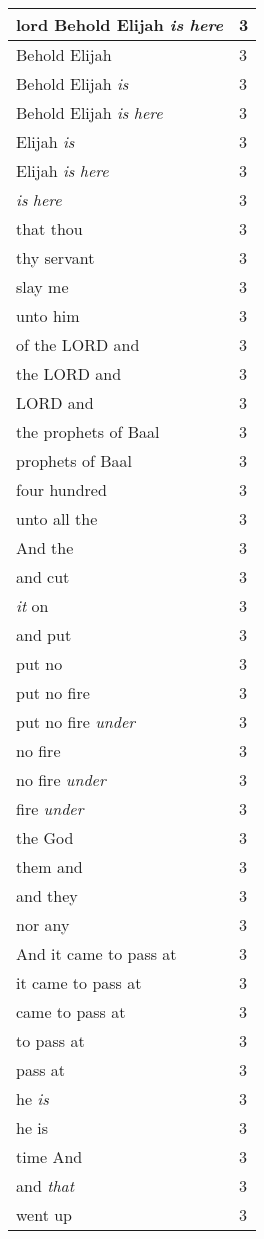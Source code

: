 \begin{center}
\begin{longtable}{|p{3.0in}|p{0.5in}|}
lord Behold Elijah \emph{is} \emph{here} & 3\\ \hline 
Behold Elijah & 3\\ \hline 
Behold Elijah \emph{is} & 3\\ \hline 
Behold Elijah \emph{is} \emph{here} & 3\\ \hline 
Elijah \emph{is} & 3\\ \hline 
Elijah \emph{is} \emph{here} & 3\\ \hline 
\emph{is} \emph{here} & 3\\ \hline 
that thou & 3\\ \hline 
thy servant & 3\\ \hline 
slay me & 3\\ \hline 
unto him & 3\\ \hline 
of the LORD and & 3\\ \hline 
the LORD and & 3\\ \hline 
LORD and & 3\\ \hline 
the prophets of Baal & 3\\ \hline 
prophets of Baal & 3\\ \hline 
four hundred & 3\\ \hline 
unto all the & 3\\ \hline 
And the & 3\\ \hline 
and cut & 3\\ \hline 
\emph{it} on & 3\\ \hline 
and put & 3\\ \hline 
put no & 3\\ \hline 
put no fire & 3\\ \hline 
put no fire \emph{under} & 3\\ \hline 
no fire & 3\\ \hline 
no fire \emph{under} & 3\\ \hline 
fire \emph{under} & 3\\ \hline 
the God & 3\\ \hline 
them and & 3\\ \hline 
and they & 3\\ \hline 
nor any & 3\\ \hline 
And it came to pass at & 3\\ \hline 
it came to pass at & 3\\ \hline 
came to pass at & 3\\ \hline 
to pass at & 3\\ \hline 
pass at & 3\\ \hline 
he \emph{is} & 3\\ \hline 
he is & 3\\ \hline 
time And & 3\\ \hline 
and \emph{that} & 3\\ \hline 
went up & 3\\ \hline 
\end{longtable}
\end{center}





